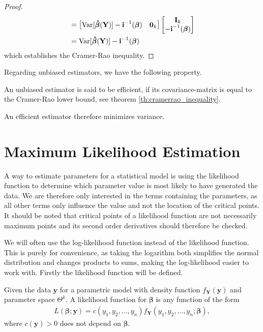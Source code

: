 \begin{proof}
\begin{align*}
    &= \begin{bmatrix} \operatorname{\text{Var}}[\boldsymbol{\hat{\beta}}(\textbf{Y})] -\textbf{i}^{-1}(\boldsymbol{\beta}) & \textbf{0}_{k}\end{bmatrix} \begin{bmatrix} \textbf{I}_{k} \\ -\textbf{i}^{-1}(\boldsymbol{\beta})\end{bmatrix} \\
    &= \operatorname{\text{Var}}[\boldsymbol{\hat{\beta}}(\textbf{Y})] -\textbf{i}^{-1}(\boldsymbol{\beta})
\end{align*}
which establishes the Cramer-Rao inequality.
\end{proof}
Regarding unbiased estimators, we have the following property.
\begin{definition} 
\label{def:efficient_estimator}
An unbiased estimator is said to be efficient, if its covariance-matrix is equal to the Cramer-Rao lower bound, see theorem \ref{th:cramerrao_inequality}.
\end{definition}
An efficient estimator therefore minimizes variance. 
 
\section{Maximum Likelihood Estimation}

A way to estimate parameters for a statistical model is using the likelihood function to determine which parameter value is most likely to have generated the data. We are therefore only interested in the terms containing the parameters, as all other terms only influence the value and not the location of the critical points. It should be noted that critical points of a likelihood function are not necessarily maximum points and its second order derivatives should therefore be checked.

We will often use the log-likelihood function instead of the likelihood function. 
This is purely for convenience, as taking the logarithm both simplifies the normal distribution and changes products to sums, making the log-likelihood easier to work with. Firstly the likelihood function will be defined.

\begin{definition} 
\label{def:likelihood_function}
Given the data $\textbf{y}$ for a parametric model with density function $f_\textbf{Y}(\textbf{y})$ and parameter space $\Theta^k$. 
A likelihood function for $\boldsymbol{\beta}$ is any function of the form 
\begin{align*}
    L(\boldsymbol{\beta}; \textbf{y}) = c(y_1, y_2, \ldots, y_n)f_\textbf{Y}(y_1, y_2, \ldots, y_n; \boldsymbol{\beta}), 
\end{align*}
where $c(\textbf{y})>0$ does not depend on $\boldsymbol{\beta}$. 
\end{definition}

